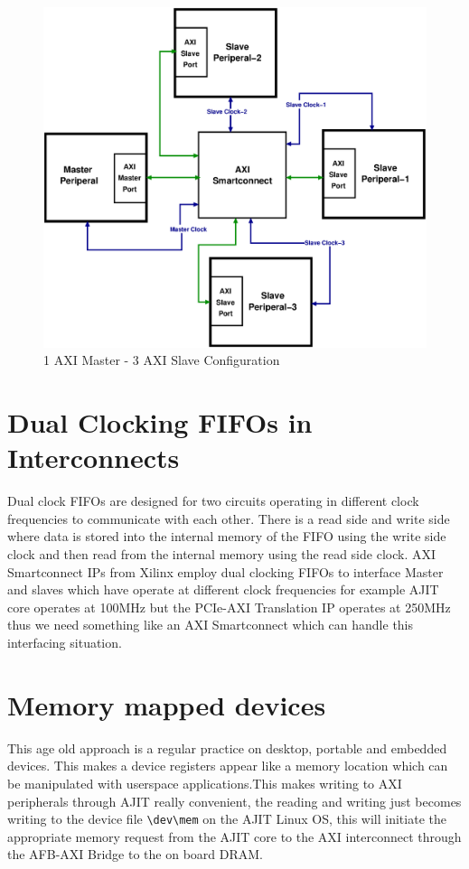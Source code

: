 \begin{figure}[H]
\centering
\includegraphics[width=\textwidth]{eps_pdf_sources/ajit_fpga/System_Level/One_Master_Multi_Slave}
\caption{1 AXI Master - 3 AXI Slave Configuration}
\end{figure}

\section{Dual Clocking FIFOs in Interconnects}

Dual clock FIFOs are designed for two circuits operating in different clock frequencies to communicate with each other. There is a read side
and write side where data is stored into the internal memory of the FIFO using the write side clock and then read from the internal memory
using the read side clock. AXI Smartconnect IPs from Xilinx employ dual clocking FIFOs to interface Master and slaves which have operate at
different clock frequencies for example AJIT core operates at 100MHz but the PCIe-AXI Translation IP operates at 250MHz thus we need
something like an AXI Smartconnect which can handle this interfacing situation.

\section{Memory mapped devices}

This age old approach is a regular practice on desktop, portable and embedded devices. This makes a device registers appear like a memory
location which can be manipulated with userspace applications.This makes writing to AXI peripherals through AJIT really convenient, the
reading and writing just becomes writing to the device file \verb|\dev\mem| on the AJIT Linux OS, this will initiate the appropriate memory
request from the AJIT core to the AXI interconnect through the AFB-AXI Bridge to the on board DRAM.


